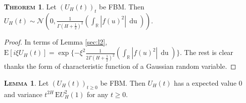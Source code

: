 \documentclass[a4paper, twoside, 11pt]{article}
\theoremstyle{definition}
\newtheorem{theorem}[definition]{\scshape Theorem}
\newtheorem{lemma}[definition]{\scshape Lemma}
\begin{document}
\begin{theorem}
  Let $(U_H(t))_t$ be FBM. Then $U_H(t) \sim \mathcal{N}(0, \frac{1}{\Gamma(H+\frac{1}{2})^2}(\int_{\mathbb{R}} |f(u)^2|\, \mathop{du}))$.
  \label{sec:the1}
\end{theorem}
\begin{proof}
  In terms of Lemma \ref{sec:l2}, $\mathrm{E}[i\xi U_H(t)] = \exp\{-\xi^2 \frac{1}{2\Gamma(H+\frac{1}{2})^2}(\int_{\mathbb{R}} |f(u)^2|\, \mathop{du})\}$. The rest is clear thanks the form of characteristic function of a Gaussian random variable.
\end{proof}
\begin{lemma}
  Let $(U_H(t))_{t\ge 0}$ be FBM. Then $U_H(t)$ has a expected value $0$ and variance $t^{2H}\, \mathrm{E} U^2_H(1)$ for any $t \ge 0$.
  \label{sec:fbmp1}
\end{lemma}
\end{document}
